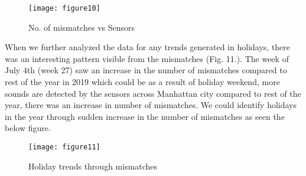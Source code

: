 	\begin{figure}[h!]
		\centering
		\texttt{[image: figure10]}
		\caption{No. of mismatches vs Sensors}
	\end{figure}

	When we further analyzed the data for any trends generated in holidays, there was an interesting pattern visible from the mismatches (Fig. 11.). The week of July 4th (week 27) saw an increase in the number of mismatches compared to rest of the year in 2019 which could be as a result of holiday weekend, more sounds are detected by the sensors across Manhattan city compared to rest of the year, there was an increase in number of mismatches. We could identify holidays in the year through sudden increase in the number of mismatches as seen the below figure.

	\begin{figure}[h!]
		\centering
		\texttt{[image: figure11]}
		\caption{Holiday trends through mismatches}
	\end{figure}
